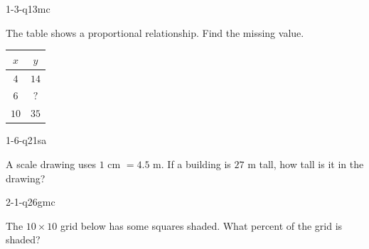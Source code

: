 
\begin{practiceQuestion}{1-3-q13}{mc}
\begin{questionText}
The table shows a proportional relationship. Find the missing value.

\begin{center}
\begin{tabular}{|c|c|}
\hline $x$ & $y$ \\ \hline $4$ & $14$ \\ $6$ & $?$ \\ $10$ & $35$ \\ \hline
\end{tabular}
\end{center}
\end{questionText}
\end{practiceQuestion}

\begin{practiceQuestion}{1-6-q21}{sa}
\begin{questionText}
A scale drawing uses $1$ cm $= 4.5$ m. If a building is $27$ m tall, how tall is it in the drawing?
\end{questionText}
\end{practiceQuestion}

\begin{practiceQuestion}{2-1-q26}{gmc}
\begin{questionText}
The $10 \times 10$ grid below has some squares shaded. What percent of the grid is shaded?

\begin{center}
\end{center}
\end{questionText}
\end{practiceQuestion}

